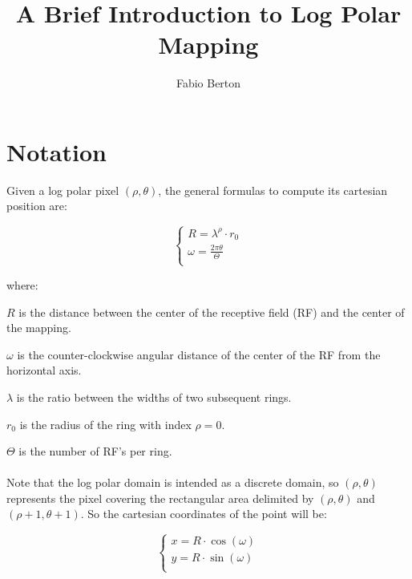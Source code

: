 \documentclass{article}
\begin{document}
	
\title{A Brief Introduction to Log Polar Mapping}
\author{Fabio Berton}
\maketitle
\section{Notation}
\label{sec:Notation}

Given a log polar pixel $(\rho,\theta)$, the general formulas to compute its cartesian position are:
	
\begin{equation}
	\begin{cases}
	R = \lambda^{\rho} \cdot r_{0} \\
	\omega = \frac{2\pi\theta }{\Theta} \\
	\end{cases}
\end{equation}

where:

$R$ is the distance between the center of the receptive field (RF) and the center of the mapping.

$\omega$ is the counter-clockwise angular distance of the center of the RF from the horizontal axis.

$\lambda$ is the ratio between the widths of two subsequent rings.

$r_{0}$ is the radius of the ring with index $\rho = 0$.

$\Theta$ is the number of RF's per ring.

\paragraph{}

 Note that the log polar domain is intended as a discrete domain, so $(\rho,\theta)$ represents the pixel covering the rectangular area delimited by $(\rho,\theta)$ and $(\rho+1,\theta+1)$. So the cartesian coordinates of the point will be:

\begin{equation}
	\begin{cases}
	x=R \cdot \cos (\omega)\\
	y=R \cdot \sin (\omega)\\
	\end{cases}
\end{equation}
\end{document}
